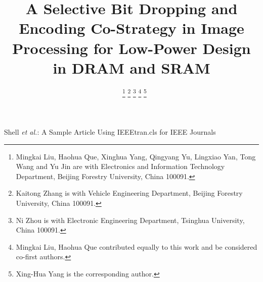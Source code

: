 \documentclass[lettersize,journal]{IEEEtran}
\begin{document}
\title{A Selective Bit Dropping and Encoding Co-Strategy  in Image Processing for Low-Power Design in DRAM and SRAM}
\author{~
\thanks{Mingkai Liu, Haohua Que, Xinghua Yang, Qingyang Yu, Lingxiao Yan, Tong Wang and Yu Jin are with Electronics and Information Technology Department, Beijing Forestry University, China 100091.}
\thanks{Kaitong Zhang is with Vehicle Engineering Department, Beijing Forestry University, China 100091. }
\thanks{Ni Zhou is with Electronic Engineering Department, Tsinghua University, China 100091.}
\thanks{Mingkai Liu, Haohua Que contributed equally to this work and be considered co-first authors.}
\thanks{Xing-Hua Yang is the corresponding author.}
}

%
{Shell \MakeLowercase{\textit{et al.}}: A Sample Article Using IEEEtran.cls for IEEE Journals}

\end{document}
